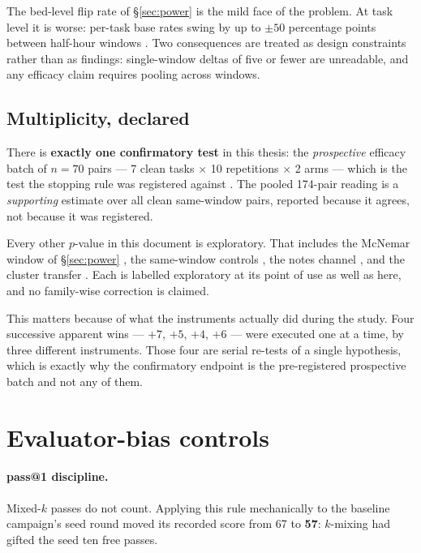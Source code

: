 The bed-level flip rate of \S\ref{sec:power} is the mild face of the
problem. At task level it is worse: per-task base rates swing by up to
$\pm 50$ percentage points between half-hour windows . Two
consequences are treated as design constraints rather than as findings:
single-window deltas of five or fewer are unreadable, and any efficacy
claim requires pooling across windows.

\subsection*{Multiplicity, declared}

There is \textbf{exactly one confirmatory test} in this thesis: the
\emph{prospective} efficacy batch of $n{=}70$ pairs --- 7 clean tasks
$\times$ 10 repetitions $\times$ 2 arms --- which is the test the stopping
rule was registered against . The pooled 174-pair reading is a
\emph{supporting} estimate over all clean same-window pairs, reported
because it agrees, not because it was registered.

Every other $p$-value in this document is exploratory. That includes the
McNemar window of \S\ref{sec:power} , the same-window controls
, the notes channel , and the cluster transfer . Each is
labelled exploratory at its point of use as well as here, and no
family-wise correction is claimed.

This matters because of what the instruments actually did during the study.
Four successive apparent wins --- $+7$, $+5$, $+4$, $+6$ --- were executed
one at a time, by three different instruments. Those four are serial
re-tests of a single hypothesis, which is exactly why the confirmatory
endpoint is the pre-registered prospective batch and not any of them.

\section{Evaluator-bias controls}
\label{sec:evaluator-bias}

\paragraph{pass@1 discipline.} Mixed-$k$ passes do not count. Applying this
rule mechanically to the baseline campaign's seed round moved its recorded
score from 67 to \textbf{57}: $k$-mixing had gifted the seed ten free
passes.

